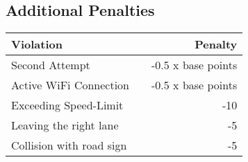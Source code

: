 {

\subsection*{Additional Penalties}
\begin{table}[H]
    \begin{tabular}{@{}lcr@{}}
        \toprule
        \textbf{Violation}       &  & \textbf{Penalty}   \\
        \midrule
        Second Attempt           &  & -0.5 x base points \\
        Active WiFi Connection   &  & -0.5 x base points \\
        Exceeding Speed-Limit    &  & -10                \\
        Leaving the right lane   &  & -5                 \\
        Collision with road sign &  & -5                 \\
        \bottomrule
    \end{tabular}
\end{table}
\clearpage
}
